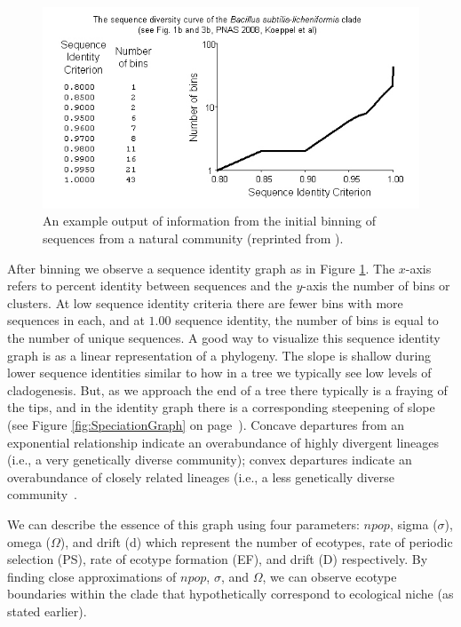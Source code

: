 \begin{figure}[h!]
 \centering
 \label{fig:Binning}
 \includegraphics[scale=1.75]{images/Binning-CH2}
 \caption[Sequence identity graph and example output produced by binning.]{An example output of information from the initial binning of sequences from a natural community (reprinted from \protect\cite{koeppel2008identifying}). }
  \label{fig:Binning}
\end{figure}

After binning we observe a sequence identity graph as in Figure \ref{fig:Binning}.
The $x$-axis refers to percent identity between sequences and the $y$-axis the number of bins or clusters.
At low sequence identity criteria there are fewer bins with more sequences in each, and at $1.00$ sequence identity, the number of bins is equal to the number of unique sequences.
A good way to visualize this sequence identity graph is as a linear representation of a phylogeny.
The slope is shallow during lower sequence identities similar to how in a tree we typically see low levels of cladogenesis.
But, as we approach the end of a tree there typically is a fraying of the tips, and in the identity graph there is a corresponding steepening of slope (see Figure \ref{fig:SpeciationGraph} on page~\pageref{fig:SpeciationGraph}).
Concave departures from an exponential relationship indicate an overabundance of highly divergent lineages (i.e., a very genetically diverse community); convex departures indicate an overabundance of closely related lineages (i.e., a less genetically diverse community~\cite{bohannan2003new}.

We can describe the essence of this graph using four parameters: $npop$, sigma ($\sigma$), omega ($\Omega$), and drift (d) which represent the number of ecotypes, rate of periodic selection (PS), rate of ecotype formation (EF), and drift (D) respectively.
By finding close approximations of $npop$, $\sigma$, and $\Omega$, we can observe ecotype boundaries within the clade that hypothetically correspond to ecological niche (as stated earlier).

